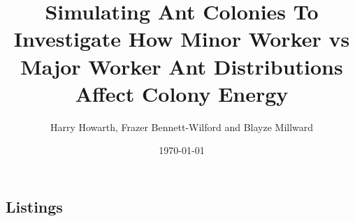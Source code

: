 \documentclass[11pt,oneside,titlepage]{article}
\title{Simulating Ant Colonies To Investigate How Minor Worker vs Major Worker Ant Distributions Affect Colony Energy}
\author{Harry Howarth, Frazer Bennett-Wilford and Blayze Millward}
\date{\today}
\begin{document}
  \maketitle
  
  \tableofcontents
  \newpage
  \listoffigures
  \listoftables
  
  
  
  
  
  \newpage
  
  \newpage
  
  \newpage
  
  \newpage
  
  
  
  \newpage
  
  

  \newpage
  \begin{appendix}
   
    
    \section*{Listings}
  \end{appendix}
  
\end{document}
